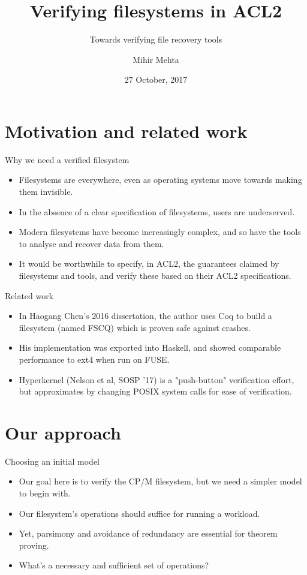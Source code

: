 \documentclass{beamer}
\title{Verifying filesystems in ACL2}
\subtitle{Towards verifying file recovery tools}
\author{Mihir Mehta}
\institute{
  Department of Computer Science\\
  University of Texas at Austin\\[1ex]
  \texttt{mihir@cs.utexas.edu}
}
\date{27 October, 2017}
\begin{document}
\begin{frame}[plain]
  \titlepage
\end{frame}


\section{Motivation and related work}

\begin{frame}{Why we need a verified filesystem}
  \begin{itemize}
  \item Filesystems are everywhere, even as operating systems move
    towards making them invisible.
  \item In the absence of a clear specification of filesystems, users
    are underserved.
  \item Modern filesystems have become increasingly complex, and so
    have the tools to analyse and recover data from them.
  \item It would be worthwhile to specify, in ACL2, the guarantees
    claimed by filesystems and tools, and verify these based on their
    ACL2 specifications.
  \end{itemize}
\end{frame}

\begin{frame}{Related work}
  \begin{itemize}
  \item In Haogang Chen's 2016 dissertation, the author uses Coq to
    build a filesystem (named FSCQ) which is proven safe against
    crashes.
  \item His implementation was exported into Haskell, and showed
    comparable performance to ext4 when run on FUSE.
  \item Hyperkernel (Nelson et al, SOSP '17) is a "push-button"
    verification effort, but approximates by changing POSIX system
    calls for ease of verification.
  \end{itemize}
\end{frame}

\section{Our approach}

\begin{frame}{Choosing an initial model}
  \begin{itemize}
    \item Our goal here is to verify the CP/M filesystem, but we need
      a simpler model to begin with.
    \item Our filesystem's operations should suffice for running a
      workload.
    \item Yet, parsimony and avoidance of redundancy are essential for
      theorem proving.
    \item What's a necessary and sufficient set of operations?
  \end{itemize}
\end{frame}
\end{document}
